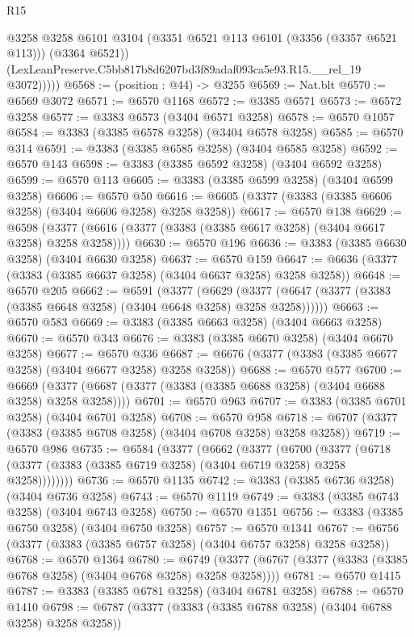 \begin{lexlean}{R15}
\begin{coremodule}
              @3258
              @3258
              @6101
              @3104
              (@3351 @6521 @113 @6101 (@3356 (@3357 @6521 @113)))
              (@3364 @6521))
            (LexLeanPreserve.C5bb817b8d6207bd3f89adaf093ca5e93.R15.__rel_19 @3072)))))
@6568 := (position : @44) -> @3255
@6569 := Nat.blt
@6570 := @6569 @3072
@6571 := @6570 @1168
@6572 := @3385 @6571
@6573 := @6572 @3258
@6577 := @3383 @6573 (@3404 @6571 @3258)
@6578 := @6570 @1057
@6584 := @3383 (@3385 @6578 @3258) (@3404 @6578 @3258)
@6585 := @6570 @314
@6591 := @3383 (@3385 @6585 @3258) (@3404 @6585 @3258)
@6592 := @6570 @143
@6598 := @3383 (@3385 @6592 @3258) (@3404 @6592 @3258)
@6599 := @6570 @113
@6605 := @3383 (@3385 @6599 @3258) (@3404 @6599 @3258)
@6606 := @6570 @50
@6616 := @6605 (@3377 (@3383 (@3385 @6606 @3258) (@3404 @6606 @3258) @3258 @3258))
@6617 := @6570 @138
@6629 := @6598 (@3377 (@6616 (@3377 (@3383 (@3385 @6617 @3258) (@3404 @6617 @3258) @3258 @3258))))
@6630 := @6570 @196
@6636 := @3383 (@3385 @6630 @3258) (@3404 @6630 @3258)
@6637 := @6570 @159
@6647 := @6636 (@3377 (@3383 (@3385 @6637 @3258) (@3404 @6637 @3258) @3258 @3258))
@6648 := @6570 @205
@6662 := @6591
    (@3377
      (@6629 (@3377 (@6647 (@3377 (@3383 (@3385 @6648 @3258) (@3404 @6648 @3258) @3258 @3258))))))
@6663 := @6570 @583
@6669 := @3383 (@3385 @6663 @3258) (@3404 @6663 @3258)
@6670 := @6570 @343
@6676 := @3383 (@3385 @6670 @3258) (@3404 @6670 @3258)
@6677 := @6570 @336
@6687 := @6676 (@3377 (@3383 (@3385 @6677 @3258) (@3404 @6677 @3258) @3258 @3258))
@6688 := @6570 @577
@6700 := @6669 (@3377 (@6687 (@3377 (@3383 (@3385 @6688 @3258) (@3404 @6688 @3258) @3258 @3258))))
@6701 := @6570 @963
@6707 := @3383 (@3385 @6701 @3258) (@3404 @6701 @3258)
@6708 := @6570 @958
@6718 := @6707 (@3377 (@3383 (@3385 @6708 @3258) (@3404 @6708 @3258) @3258 @3258))
@6719 := @6570 @986
@6735 := @6584
    (@3377
      (@6662
        (@3377
          (@6700
            (@3377 (@6718 (@3377 (@3383 (@3385 @6719 @3258) (@3404 @6719 @3258) @3258 @3258))))))))
@6736 := @6570 @1135
@6742 := @3383 (@3385 @6736 @3258) (@3404 @6736 @3258)
@6743 := @6570 @1119
@6749 := @3383 (@3385 @6743 @3258) (@3404 @6743 @3258)
@6750 := @6570 @1351
@6756 := @3383 (@3385 @6750 @3258) (@3404 @6750 @3258)
@6757 := @6570 @1341
@6767 := @6756 (@3377 (@3383 (@3385 @6757 @3258) (@3404 @6757 @3258) @3258 @3258))
@6768 := @6570 @1364
@6780 := @6749 (@3377 (@6767 (@3377 (@3383 (@3385 @6768 @3258) (@3404 @6768 @3258) @3258 @3258))))
@6781 := @6570 @1415
@6787 := @3383 (@3385 @6781 @3258) (@3404 @6781 @3258)
@6788 := @6570 @1410
@6798 := @6787 (@3377 (@3383 (@3385 @6788 @3258) (@3404 @6788 @3258) @3258 @3258))

\end{coremodule}
\end{lexlean}
